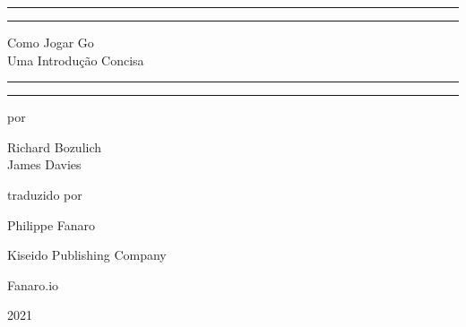 \begin{titlepage}
    \centering
    
    \scshape
    
    \vspace*{\baselineskip}
    
    
    \rule{\textwidth}{1.6pt}\vspace*{-\baselineskip}\vspace*{2pt}
    \rule{\textwidth}{0.4pt}
    
    \vspace{0.7\baselineskip}
    
    \Huge{Como Jogar Go}\\
    \vspace*{10pt}
    \LARGE{Uma Introdução Concisa}
    
    \vspace{0.275\baselineskip}
    
    \rule{\textwidth}{0.4pt}\vspace*{-\baselineskip}\vspace{3.2pt}
    \rule{\textwidth}{1.6pt}
    
    
    \vspace*{2cm}

    \large{por}

    \vspace*{0.125cm}
    
    \Large{Richard Bozulich \\ James Davies}
    
    \vspace*{1.5cm}

    \large{traduzido por}

    \vspace*{0.125cm}

    \Large{Philippe Fanaro}
    
    \vfill
    
    
    \large{Kiseido Publishing Company}

    \vspace*{0.25cm}
    
    \large{Fanaro.io}

    \vspace{1.5cm}

    \large{2021}
\end{titlepage}